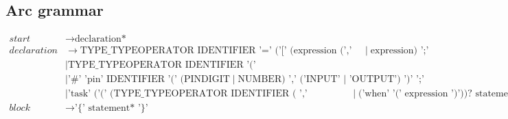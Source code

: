 \subsection{Arc grammar}\label{sec:arcgrammar}

\begin{align*}
    start       & \to \text{declaration*}                                                                                                               \\ %
    declaration & \to \text{TYPE\_TYPEOPERATOR IDENTIFIER '=' ('[' (expression (',' expression)*)? ']'} \mid \text{expression) ';'}                     \\ %
                & \mid \text{TYPE\_TYPEOPERATOR IDENTIFIER '(' (TYPE\_TYPEOPERATOR IDENTIFIER (',' TYPE\_TYPEOPERATOR IDENTIFIER)*)? ')' statement*}    \\ %
                & \mid \text{'\#' 'pin' IDENTIFIER '(' (PINDIGIT} \mid \text{NUMBER) ',' ('INPUT' | 'OUTPUT') ')' ';' }                                 \\ %
                & \mid \text{'task' ('(' (TYPE\_TYPEOPERATOR IDENTIFIER ( ',' TYPE\_TYPEOPERATOR IDENTIFIER)*)? ')')? (('every' NUMBER)} \mid \text{('when' '(' expression ')'))? statement*} \\ %
    block & \to \text{'\{' statement* '\}'} \\
            \end{align*}
 
